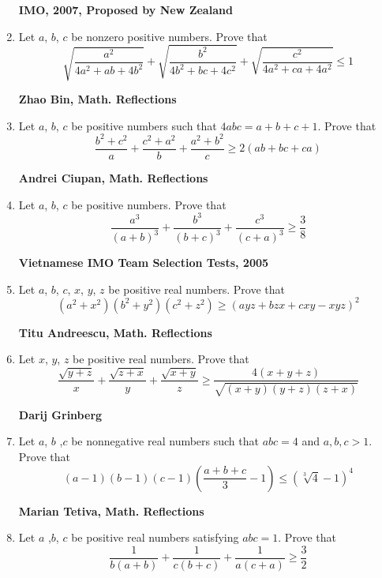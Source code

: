 \documentclass{article}
\begin{document}
\begin{enumerate}
\begin {enumerate}
\end {enumerate}
\begin {flushright}
\textbf{IMO, 2007, Proposed by New Zealand}
\end{flushright}
\item Let $a$, $b$, $c$ be nonzero positive numbers. Prove that $$\sqrt{\frac{a^2}{4a^2+ab+4b^2}}+\sqrt{\frac{b^2}{4b^2+bc+4c^2}}+\sqrt{\frac{c^2}{4a^2+ca+4a^2}}\leq 1$$
\begin {flushright}
\textbf{Zhao Bin, Math. Reflections}
\end{flushright}
\item Let $a$, $b$, $c$ be positive numbers such  that $4abc = a+b+c+1$. Prove that $$\frac {b^2+c^2}{a}+\frac {c^2+a^2}{b}+\frac {a^2+b^2}{c}\geq 2 (ab+bc+ca)$$
\begin {flushright}
\textbf{Andrei Ciupan, Math. Reflections}
\end{flushright}
\item Let $a$, $b$, $c$ be positive numbers. Prove that $$\frac {a^3}{(a+b)^3}+\frac {b^3}{(b+c)^3}+\frac {c^3}{(c+a)^3}\geq \frac {3}{8}$$
\begin {flushright}
\textbf{Vietnamese IMO Team Selection Tests, 2005}
\end{flushright}
\item Let $a$, $b$, $c$, $x $, $y $, $z $ be positive real numbers. Prove that $$(a^2+x^2)(b^2+y^2)(c^2+z^2)\geq (ayz+bzx+cxy-xyz)^2$$
\begin {flushright}
\textbf{Titu Andreescu, Math. Reflections}
\end{flushright}
\item Let $x $, $y $, $z $ be positive real numbers. Prove that $$\frac {\sqrt {y+z}}{x}+\frac {\sqrt {z+x}}{y}+\frac {\sqrt {x+y}}{z} \geq \frac {4 (x+y+z)}{\sqrt {(x+y)(y+z)(z+x)}}$$
\begin {flushright}
\textbf{Darij Grinberg}
\end{flushright}
\item Let $a$, $b$ ,$c$ be nonnegative real numbers such that $abc = 4$ and $a, b, c > 1$. Prove that $$(a-1)(b-1)(c-1)(\frac{a+b+c}{3}-1)\leq \left(\sqrt[3]{4}-1\right)^4$$
\begin {flushright}
\textbf{Marian Tetiva, Math. Reflections}
\end{flushright}
\item Let $a$ ,$b$, $c$ be positive real numbers satisfying $abc = 1$. Prove that $$\frac{1}{b(a+b)}+\frac{1}{c(b+c)}+\frac{1}{a(c+a)}\geq \frac{3}{2}$$
\begin {flushright}

\end{flushright}
\end{enumerate}
\end{document}
